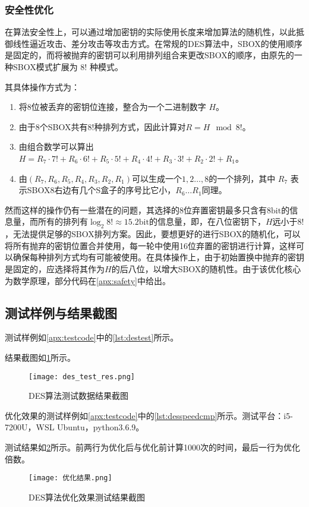\documentclass[a4paper, zihao=-4, UTF-8]{ctexart}
\newcommand{\upcite}[1]{{\textsuperscript{\cite{#1}}}}
\begin{document}
				\subsubsection{安全性优化}
					在算法安全性上，可以通过增加密钥的实际使用长度来增加算法的随机性，以此抵御线性逼近攻击、差分攻击等攻击方式。在常规的DES算法中，SBOX的使用顺序是固定的，而将被抛弃的密钥可以利用排列组合来更改SBOX的顺序，由原先的一种SBOX模式扩展为 $8!$ 种模式\upcite{3}。
					\par 其具体操作方式为\upcite{4}：
					\begin{enumerate}[1.]
						\item 将8位被丢弃的密钥位连接，整合为一个二进制数字 $H$。
						\item 由于8个SBOX共有$8!$种排列方式，因此计算对$R=H\mod{8!}$。
						\item 由组合数学可以算出 $H=R_7\cdot 7!+R_6\cdot 6!+R_5\cdot 5!+R_4\cdot 4!+R_3\cdot 3!+R_2\cdot 2!+R_1$。
						\item 由$(R_7,R_6,R_5,R_4,R_3,R_2,R_1)$可以生成一个$1,2\ldots,8$的一个排列，其中 $R_7$ 表示SBOX8右边有几个S盒子的序号比它小，$R_6\ldots R_1$同理。
					\end{enumerate}
					\par 然而这样的操作仍有一些潜在的问题，其选择的8位弃置密钥最多只含有$8\mathrm{bit}$的信息量，而所有的排列有$\log_2 8!\approx15.2\mathrm{bit}$的信息量，即，在八位密钥下，$H$远小于$8!$，无法提供足够的SBOX排列方案。因此，要想更好的进行SBOX的随机化，可以将所有抛弃的密钥位置合并使用，每一轮中使用16位弃置的密钥进行计算，这样可以确保每种排列方式均有可能被使用。在具体操作上，由于初始置换中抛弃的密钥是固定的，应选择将其作为$H$的后八位，以增大SBOX的随机性。由于该优化核心为数学原理，部分代码在\cref{apx:safety}中给出。
		\subsection{测试样例与结果截图}
			测试样例如\cref{apx:testcode}中的\cref{lst:destest}所示。
			\par 结果截图如\cref{fig:destestres}所示。
			\begin{figure}[htbp]
				\centering
				\texttt{[image: des\_test\_res.png]}
				\caption{DES算法测试数据结果截图}
				\label{fig:destestres}
			\end{figure}
			\par 优化效果的测试样例如\cref{apx:testcode}中的\cref{lst:desspeedcmp}所示。测试平台：i5-7200U，WSL Ubuntu，python3.6.9。

			测试结果如\cref{fig:destestspeed}所示。前两行为优化后与优化前计算1000次的时间，最后一行为优化倍数。
			\begin{figure}[htbp]
				\centering
				\texttt{[image: 优化结果.png]}
				\caption{DES算法优化效果测试结果截图}
				\label{fig:destestspeed}
			\end{figure}
\end{document}

